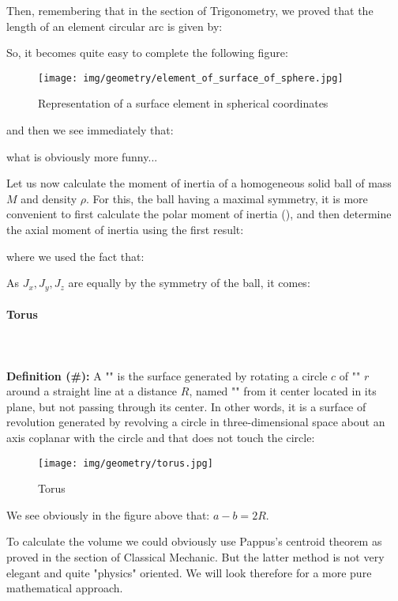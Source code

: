 {	Then, remembering that in the section of Trigonometry, we proved that the length of an element circular arc is given by:
	
	So, it becomes quite easy to complete the following figure:
	\begin{figure}[H]
		\centering
		\texttt{[image: img/geometry/element\_of\_surface\_of\_sphere.jpg]}
		\caption{Representation of a surface element in spherical coordinates}
	\end{figure}
	and then we see immediately that:
	
	what is obviously more funny...

	Let us now calculate the moment of inertia of a homogeneous solid ball of mass $M$ and density $\rho$. For this, the ball having a maximal symmetry, it is more convenient to first calculate the polar moment of inertia (), and then determine the axial moment of inertia using the first result:
	
	where we used the fact that:
	
	As $J_x,J_y,J_z$ are equally by the symmetry of the ball, it comes\label{inertia momentum ball}:
	
	
	\pagebreak
	\paragraph{Torus}\mbox{}\\\\
	\textbf{Definition (\#\mydef):} A "" is the surface generated by rotating a circle $c$ of "" $r$ around a straight line at a distance $R$, named "" from it center located in its plane, but not passing through its center. In other words,  it is a surface of revolution generated by revolving a circle in three-dimensional space about an axis coplanar with the circle and that does not touch the circle:
	\begin{figure}[H]
		\centering
		\texttt{[image: img/geometry/torus.jpg]}
		\caption{Torus}
	\end{figure}
	We see obviously in the figure above that: $a-b=2R$.
	
	To calculate the volume we could obviously use Pappus's centroid theorem as proved in the section of Classical Mechanic. But the latter method is not very elegant and quite "physics" oriented. We will look therefore for a more pure mathematical approach.
	
}
